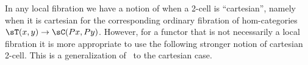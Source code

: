 \documentclass{amsart}
\begin{document}


In any local fibration we have a notion of when a 2-cell is ``cartesian'', namely when it is cartesian for the corresponding ordinary fibration of hom-categories $\sT(x,y) \to \sC(Px,Py)$.
However, for a functor that is not necessarily a local fibration it is more appropriate to use the following stronger notion of cartesian 2-cell.
This is a generalization of~\cite[Definition 2.2]{hermida:2fib} to the cartesian case.
\end{document}
